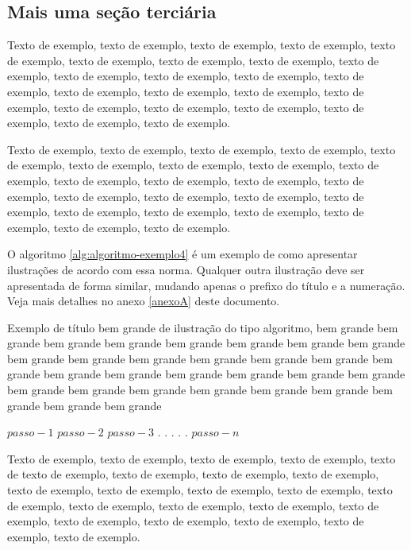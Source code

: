 \documentclass[
	12pt,				%
	oneside,			%
	a4paper,			%
	english,			%
	brazil				%
	]{abntex2ppgsi}
\begin{document}
\subsection{Mais uma seção terciária}

Texto de exemplo, texto de exemplo, texto de exemplo, texto de exemplo, texto de exemplo, texto de exemplo, texto de exemplo, texto de exemplo, texto de exemplo, texto de exemplo, texto de exemplo, texto de exemplo, texto de exemplo, texto de exemplo, texto de exemplo, texto de exemplo, texto de exemplo, texto de exemplo, texto de exemplo, texto de exemplo, texto de exemplo, texto de exemplo, texto de exemplo.

Texto de exemplo, texto de exemplo, texto de exemplo, texto de exemplo, texto de exemplo, texto de exemplo, texto de exemplo, texto de exemplo, texto de exemplo, texto de exemplo, texto de exemplo, texto de exemplo, texto de exemplo, texto de exemplo, texto de exemplo, texto de exemplo, texto de exemplo, texto de exemplo, texto de exemplo, texto de exemplo, texto de exemplo, texto de exemplo, texto de exemplo.

O algoritmo \ref{alg:algoritmo-exemplo4} é um exemplo de como apresentar ilustrações de acordo com essa norma. Qualquer outra ilustração deve ser apresentada de forma similar, mudando apenas o prefixo do título e a numeração. Veja mais detalhes no anexo \ref{anexoA} deste documento.

\begin{algorithm}[htbp]
\caption{Exemplo de título bem grande de ilustração do tipo algoritmo, bem grande bem grande bem grande bem grande bem grande bem grande bem grande bem grande bem grande bem grande bem grande bem grande bem grande bem grande bem grande bem grande bem grande bem grande bem grande bem grande bem grande bem grande bem grande bem grande bem grande bem grande bem grande bem grande bem grande bem grande}
\label{alg:algoritmo-exemplo4}
\begin{algorithmic}[1]
\State $passo-1$
\State $passo-2$
\State $passo-3$
\State $.$
\State $.$
\State $.$
\State $.$
\State $.$
\State $passo-n$
\EndProcedure
\end{algorithmic}
\end{algorithm}


Texto de exemplo, texto de exemplo, texto de exemplo, texto de exemplo, texto de texto de exemplo, texto de exemplo, texto de exemplo, texto de exemplo, texto de exemplo, texto de exemplo, texto de exemplo, texto de exemplo, texto de exemplo, texto de exemplo, texto de exemplo, texto de exemplo, texto de exemplo, texto de exemplo, texto de exemplo, texto de exemplo, texto de exemplo, texto de exemplo.
\end{document}
